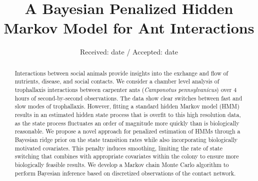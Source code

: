 \documentclass[smallextended]{svjour3}       %
\begin{document}
\title{A Bayesian Penalized Hidden Markov Model for Ant Interactions
}
%



\author{}


\institute{
}

\date{Received: date / Accepted: date}

\maketitle

\begin{abstract}
Interactions between social animals provide insights into the exchange and flow of nutrients, disease, and social contacts. We consider a chamber level analysis of trophallaxis interactions between carpenter ants (\textit{Camponotus pennsylvanicus}) over 4 hours of second-by-second observations. The data show clear switches between fast and slow modes of trophallaxis. However, fitting a standard hidden Markov model (HMM) results in an estimated hidden state process that is overfit to this high resolution data, as the state process fluctuates an order of magnitude more quickly than is biologically reasonable.  We propose a novel approach for penalized estimation of HMMs through a Bayesian ridge prior on the state transition rates while also incorporating biologically motivated covariates. This penalty induces smoothing, limiting the rate of state switching that combines with appropriate covariates within the colony to ensure more biologically feasible results. We develop a Markov chain Monte Carlo algorithm to perform Bayesian inference based on discretized observations of the contact network. 
\end{abstract}
\end{document}
